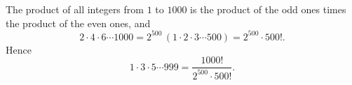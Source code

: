 The product of all integers from $1$ to $1000$ is the product of the odd ones times the product of the even ones, and
\[2\cdot4\cdot6\cdots1000=2^{500}\,(1\cdot2\cdot3\cdots500)=2^{500}\cdot500!.\]
Hence
\[1\cdot3\cdot5\cdots999=\boxed{\dfrac{1000!}{2^{500}\cdot500!}}.\]
